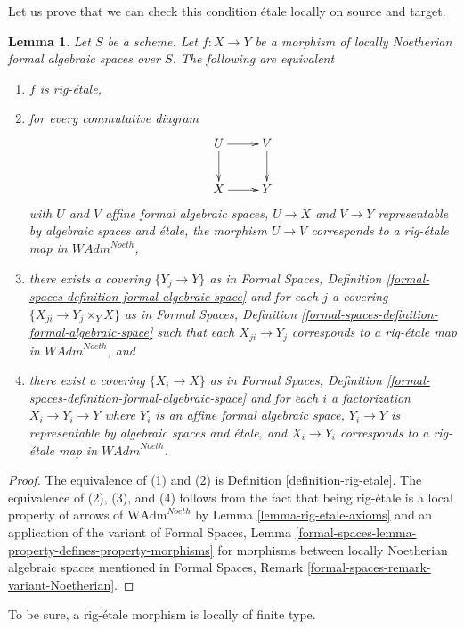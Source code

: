 \documentclass{stacks-project}
\theoremstyle{plain}
\newtheorem{lemma}[subsection]{Lemma}
\theoremstyle{definition}
\theoremstyle{remark}
\numberwithin{equation}{subsection}
\begin{document}
\noindent
Let us prove that we can check this condition \'etale locally on
source and target.

\begin{lemma}
\label{lemma-rig-etale-morphisms}
Let $S$ be a scheme. Let $f : X \to Y$ be a morphism of
locally Noetherian formal algebraic spaces over $S$.
The following are equivalent
\begin{enumerate}
\item $f$ is rig-\'etale,
\item for every commutative diagram
$$
\xymatrix{
U \ar[d] \ar[r] & V \ar[d] \\
X \ar[r] & Y
}
$$
with $U$ and $V$ affine formal algebraic spaces, $U \to X$ and $V \to Y$
representable by algebraic spaces and \'etale, the morphism $U \to V$
corresponds to a rig-\'etale map in $\textit{WAdm}^{Noeth}$,
\item there exists a covering $\{Y_j \to Y\}$ as in
Formal Spaces,
Definition \ref{formal-spaces-definition-formal-algebraic-space}
and for each $j$
a covering $\{X_{ji} \to Y_j \times_Y X\}$ as in
Formal Spaces,
Definition \ref{formal-spaces-definition-formal-algebraic-space}
such that each $X_{ji} \to Y_j$  corresponds
to a rig-\'etale map in $\textit{WAdm}^{Noeth}$, and
\item there exist a covering $\{X_i \to X\}$ as in
Formal Spaces,
Definition \ref{formal-spaces-definition-formal-algebraic-space}
and for each $i$ a factorization $X_i \to Y_i \to Y$ where $Y_i$
is an affine formal algebraic space, $Y_i \to Y$ is representable
by algebraic spaces and \'etale, and $X_i \to Y_i$ corresponds
to a rig-\'etale map in $\textit{WAdm}^{Noeth}$.
\end{enumerate}
\end{lemma}

\begin{proof}
The equivalence of (1) and (2) is Definition \ref{definition-rig-etale}.
The equivalence of (2), (3), and (4) follows from the fact that
being rig-\'etale is a local property of arrows of
$\text{WAdm}^{Noeth}$ by Lemma \ref{lemma-rig-etale-axioms}
and an application of the variant of
Formal Spaces, Lemma
\ref{formal-spaces-lemma-property-defines-property-morphisms}
for morphisms between locally Noetherian algebraic spaces
mentioned in Formal Spaces, Remark
\ref{formal-spaces-remark-variant-Noetherian}.
\end{proof}

\noindent
To be sure, a rig-\'etale morphism is locally of finite type.
\end{document}
